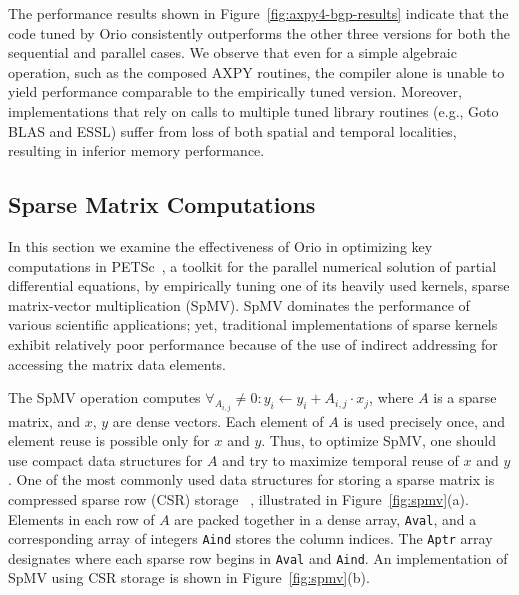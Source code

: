 The performance results shown in Figure~\ref{fig:axpy4-bgp-results} indicate
that the code tuned by Orio consistently outperforms the other three versions
for both the sequential and parallel cases. We observe that even for a simple
algebraic operation, such as the composed AXPY routines, the compiler alone
is unable to yield performance comparable to the empirically tuned
version. Moreover, implementations that rely on calls to multiple tuned
library routines (e.g., Goto BLAS and ESSL) suffer from loss of both spatial
and temporal localities, resulting in inferior memory performance.

\subsection{Sparse Matrix Computations} 

In this section we examine the effectiveness of Orio in optimizing key
computations in PETSc~\cite{petsc-user-ref}, a toolkit for the parallel
numerical solution of partial differential equations, by empirically tuning
one of its heavily used kernels, sparse matrix-vector multiplication
(SpMV). SpMV dominates the performance of various scientific applications;
yet, traditional implementations of sparse kernels exhibit relatively poor
performance because of the use of indirect addressing for accessing the
matrix data elements.

The SpMV operation computes $\forall_{A_{i,j}} \neq 0:y_{i}
\leftarrow y_{i} + A_{i,j} \cdot x_{j}$, where $A$ is a sparse matrix,
and $x$, $y$ are dense vectors. Each element of $A$ is used precisely once,
and element reuse is possible only for $x$ and $y$. Thus, to optimize SpMV,
one should use compact data structures for $A$ and try to maximize temporal
reuse of $x$ and $y$. One of the most commonly used data structures for
storing a sparse matrix is compressed sparse row (CSR) storage
~\cite{vuduc-thesis},
illustrated in Figure~\ref{fig:spmv}(a). Elements in each row of $A$ are
packed together in a dense array, \texttt{Aval}, and a corresponding array of
integers \texttt{Aind} stores the column indices. The \texttt{Aptr} array
designates where each sparse row begins in \texttt{Aval} and
\texttt{Aind}. An implementation of SpMV using CSR storage is
shown in Figure~\ref{fig:spmv}(b).

